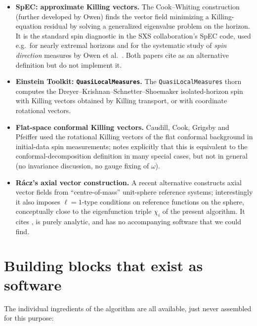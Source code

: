 \documentclass[11pt]{article}
\begin{document}
\begin{itemize}
\item \textbf{SpEC: approximate Killing vectors.}  The Cook--Whiting
  construction \cite{cookwhiting2007} (further developed by Owen) finds the
  vector field minimizing a Killing-equation residual by solving a
  generalized eigenvalue problem on the horizon.  It is the standard spin
  diagnostic in the SXS collaboration's SpEC code, used e.g.\ for
  nearly extremal horizons \cite{lovelace2014} and for the systematic study
  of \emph{spin direction} measures by Owen et al.\ \cite{owen2017}.  Both
  papers cite \cite{korzynski2007} as an alternative definition but do not
  implement it.
\item \textbf{Einstein Toolkit: \texttt{QuasiLocalMeasures}.}  The
  \texttt{QuasiLocalMeasures} thorn \cite{qlm} computes the
  Dreyer--Krishnan--Schnetter--Shoemaker isolated-horizon spin
  \cite{dkss2003} with Killing vectors obtained by Killing transport, or
  with coordinate rotational vectors.
\item \textbf{Flat-space conformal Killing vectors.}  Caudill, Cook,
  Grigsby and Pfeiffer \cite{caudill2006} used the rotational Killing
  vectors of the flat conformal background in initial-data spin
  measurements; \cite{korzynski2007} notes explicitly that this is
  equivalent to the conformal-decomposition definition in many special
  cases, but not in general (no invariance discussion, no gauge fixing of
  $\omega$).
\item \textbf{R\'acz's axial vector construction.}  A recent alternative
  \cite{racz2024} constructs axial vector fields from
  ``centre-of-mass'' unit-sphere reference systems; interestingly it also
  imposes $\ell=1$-type conditions on reference functions on the sphere,
  conceptually close to the eigenfunction triple $\chi_i$ of the present
  algorithm.  It cites \cite{korzynski2007}, is purely analytic, and has no
  accompanying software that we could find.
\end{itemize}

\section{Building blocks that exist as software}

The individual ingredients of the algorithm are all available, just never
assembled for this purpose:
\end{document}
